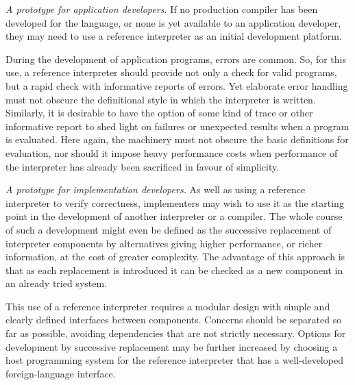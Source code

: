 \vspace{.5\baselineskip}
\noindent
\emph{A prototype for application developers.}
If no production compiler has been developed for the language,
or none is yet available to an application developer,
they may need to use a reference interpreter as
an initial development platform.

During the development of application programs, errors
are common.
So, for this use, a reference interpreter should provide
not only a check for valid programs, but a rapid check
with informative reports of errors.
Yet elaborate error handling must not obscure the
definitional style in which the interpreter is written.
Similarly, it is desirable to have the option of some
kind of trace or other informative report to shed
light on failures or unexpected results when a program
is evaluated.
Here again, the machinery must not obscure the basic
definitions for evaluation, nor should it impose heavy
performance costs when performance of the interpreter
has already been sacrificed in favour of simplicity.

\vspace{.5\baselineskip}
\noindent
\emph{A prototype for implementation developers.}
As well as using a reference interpreter to verify correctness,
implementers may wish to use it as the starting point in the
development of another interpreter or a compiler.
The whole course of such a development might even be defined as
the successive replacement of interpreter components by
alternatives giving higher performance, or richer information,
at the cost of greater complexity.
The advantage of this approach is that as each replacement
is introduced it can be checked as a new component in an already
tried system.

This use of a reference interpreter requires a
modular design with simple and clearly defined interfaces
between components.
Concerns should be separated so far as possible, avoiding
dependencies that are not strictly necessary.
Options for development by successive replacement may be further
increased by choosing a host programming system for the reference
interpreter that has a well-developed foreign-language interface. 

